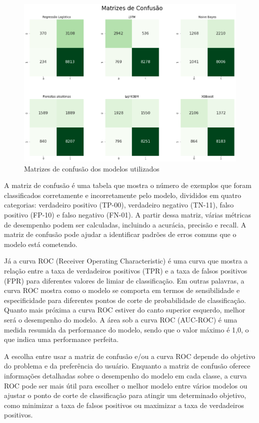 \begin{figure}[H]
    \centering
    \includegraphics[scale=0.5]{./figs/confusion.png}
    \caption{Matrizes de confusão dos modelos utilizados}
    \label{fig:mconfusion}
\end{figure}

A matriz de confusão é uma tabela que mostra o número de exemplos que foram classificados corretamente e incorretamente pelo modelo, divididos em quatro categorias: verdadeiro positivo (TP-00), verdadeiro negativo (TN-11), falso positivo (FP-10) e falso negativo (FN-01). A partir dessa matriz, várias métricas de desempenho podem ser calculadas, incluindo a acurácia, precisão e recall. A matriz de confusão pode ajudar a identificar padrões de erros comuns que o modelo está cometendo.

Já a curva ROC (Receiver Operating Characteristic) é uma curva que mostra a relação entre a taxa de verdadeiros positivos (TPR) e a taxa de falsos positivos (FPR) para diferentes valores de limiar de classificação. Em outras palavras, a curva ROC mostra como o modelo se comporta em termos de sensibilidade e especificidade para diferentes pontos de corte de probabilidade de classificação. Quanto mais próxima a curva ROC estiver do canto superior esquerdo, melhor será o desempenho do modelo. A área sob a curva ROC (AUC-ROC) é uma medida resumida da performance do modelo, sendo que o valor máximo é 1,0, o que indica uma performance perfeita.

A escolha entre usar a matriz de confusão e/ou a curva ROC depende do objetivo do problema e da preferência do usuário. Enquanto a matriz de confusão oferece informações detalhadas sobre o desempenho do modelo em cada classe, a curva ROC pode ser mais útil para escolher o melhor modelo entre vários modelos ou ajustar o ponto de corte de classificação para atingir um determinado objetivo, como minimizar a taxa de falsos positivos ou maximizar a taxa de verdadeiros positivos.

